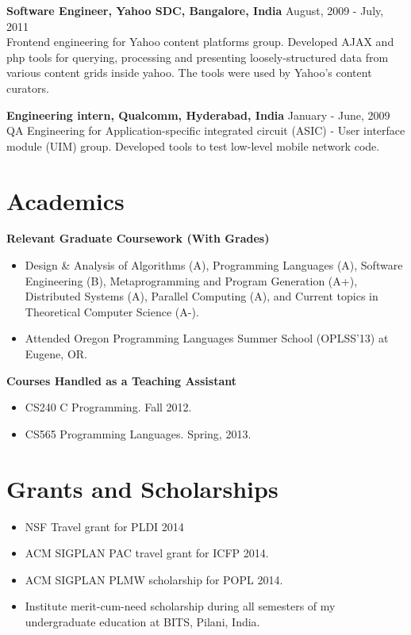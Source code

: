\documentclass[margin,line]{res}
\begin{document}
\begin{resume}
{\bf Software Engineer, Yahoo SDC, Bangalore, India} \hfill August, 2009 -
July, 2011\\
Frontend engineering for Yahoo content platforms group. Developed AJAX
and php tools for querying, processing and presenting
loosely-structured data from various content grids inside yahoo. The
tools were used by Yahoo's content curators.

{\bf Engineering intern, Qualcomm, Hyderabad, India} \hfill January - June, 2009\\
QA Engineering for Application-specific integrated circuit (ASIC) -
User interface module (UIM) group. Developed tools to test low-level
mobile network code.\\

\section{Academics}
{\bf Relevant Graduate Coursework (With Grades)}\\
\begin{itemize}
\item Design \& Analysis of Algorithms (A), Programming Languages (A),
Software Engineering (B), Metaprogramming and Program Generation (A+),
Distributed Systems (A), Parallel Computing (A), and Current topics in
Theoretical Computer Science (A-).  
\item Attended Oregon Programming Languages Summer School (OPLSS'13)
at Eugene, OR.
\end{itemize}

{\bf Courses Handled as a Teaching Assistant}\\
\begin{itemize}
\item CS240 C Programming. Fall 2012.
\item CS565 Programming Languages. Spring, 2013.
\end{itemize}

\section{Grants and Scholarships}
\begin{itemize}
\item NSF Travel grant for PLDI 2014
\item ACM SIGPLAN PAC travel grant for ICFP 2014.
\item ACM SIGPLAN PLMW scholarship for POPL 2014.
\item Institute merit-cum-need scholarship during all 
semesters of my undergraduate education at BITS, Pilani, India.
\end{itemize}


\end{resume}
\end{document}
